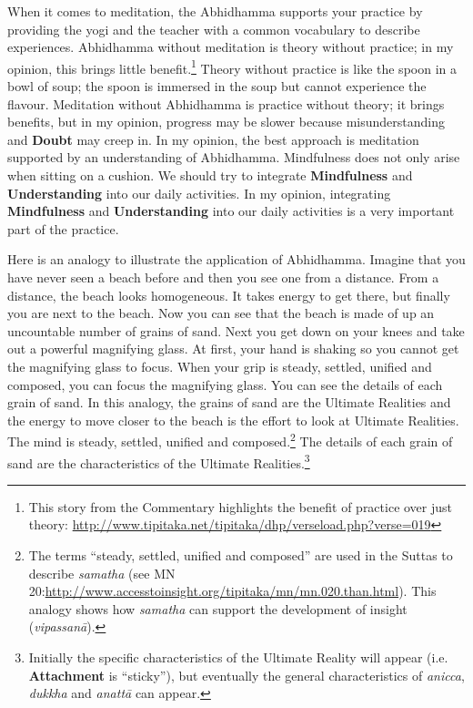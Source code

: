 When it comes to meditation, the Abhidhamma supports your practice by providing the yogi and the teacher with a common vocabulary to describe experiences. Abhidhamma without meditation is theory without practice; in my opinion, this brings little benefit.\footnote{This story from the Commentary highlights the benefit of practice over just theory: \url{http://www.tipitaka.net/tipitaka/dhp/verseload.php?verse=019}} Theory without practice is like the spoon in a bowl of soup; the spoon is immersed in the soup but cannot experience the flavour. Meditation without Abhidhamma is practice without theory; it brings benefits, but in my opinion, progress may be slower because misunderstanding and \textbf{Doubt} may creep in. In my opinion, the best approach is meditation supported by an understanding of Abhidhamma. Mindfulness does not only arise when sitting on a cushion. We should try to integrate \textbf{Mindfulness} and \textbf{Understanding} into our daily activities. In my opinion, integrating \textbf{Mindfulness} and \textbf{Understanding} into our daily activities is a very important part of the practice.

Here is an analogy to illustrate the application of Abhidhamma. Imagine that you have never seen a beach before and then you see one from a distance. From a distance, the beach looks homogeneous. It takes energy to get there, but finally you are next to the beach. Now you can see that the beach is made of up an uncountable number of grains of sand. Next you get down on your knees and take out a powerful magnifying glass. At first, your hand is shaking so you cannot get the magnifying glass to focus. When your grip is steady, settled, unified and composed, you can focus the magnifying glass. You can see the details of each grain of sand. In this analogy, the grains of sand are the Ultimate Realities and the energy to move closer to the beach is the effort to look at Ultimate Realities. The mind is steady, settled, unified and composed.\footnote{The terms “steady, settled, unified and composed” are used in the Suttas  to describe \textit{samatha} (see MN 20:\newline \url{http://www.accesstoinsight.org/tipitaka/mn/mn.020.than.html}). This analogy shows how \textit{samatha} can support the development of insight (\textit{vipassanā}).} The details of each grain of sand are the characteristics of the Ultimate Realities.\footnote{Initially the specific characteristics of the Ultimate Reality will appear (i.e. \textbf{Attachment} is “sticky”), but eventually the general characteristics of \textit{anicca}, \textit{dukkha} and \textit{anattā} can appear.}


